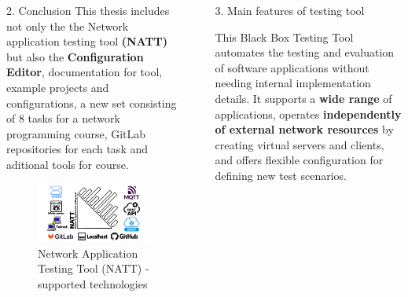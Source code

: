 \documentclass[final]{beamer}
\newlength{\sepwidth}
\newlength{\colwidth}
\newcommand{\separatorcolumn}{\begin{column}{\sepwidth}\end{column}}
\begin{document}
\begin{frame}[t]
\begin{columns}[t]
\begin{column}{\colwidth}
\begin{block}{2. Conclusion}
    \hspace{2em}This thesis includes not only the the Network application testing tool \textbf{(NATT)} but also the 
    \textbf{Configuration Editor}, documentation for tool, example projects and configurations, a new set consisting of 8 tasks 
    for a network programming course, GitLab repositories for each task and aditional tools for course.

    \begin{figure}
      \centering
        \includegraphics[width=1.0\textwidth]{./imgs/natt-banner-tech.png}
      \caption{Network Application Testing Tool (NATT) - supported technologies} 
    \end{figure}

  \end{block}

\end{column}

\separatorcolumn

\begin{column}{\colwidth}

  \begin{alertblock}{3. Main features of testing tool}

    This Black Box Testing Tool automates the testing and evaluation of software 
    applications without needing internal implementation details. It supports a 
    \textbf{wide range} of applications, operates \textbf{independently of external network resources} 
    by creating virtual servers and clients, and offers flexible configuration for 
    defining new test scenarios.


\end{alertblock}
\end{column}
\end{columns}
\end{frame}
\end{document}
